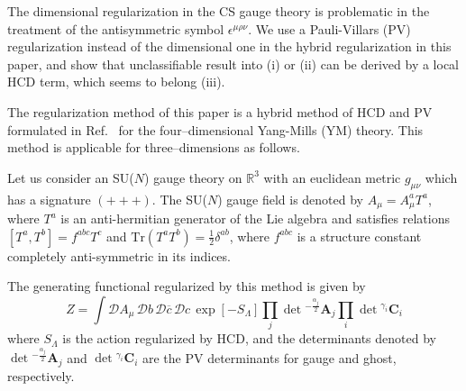 \documentclass[a4paper,12pt]{article}
\begin{document}
The dimensional regularization in the CS gauge theory is
problematic in the treatment of the antisymmetric symbol
$\epsilon^{\mu\rho\nu}$.
%
We use a Pauli-Villars (PV) regularization
instead of the dimensional one
in the hybrid regularization in this paper,
and show that unclassifiable result into (i) or (ii)
can be derived by a local HCD term,
which seems to belong (iii).





The regularization method of this paper is
a hybrid method of HCD and PV formulated in
Ref.~\cite{Nittoh:2000it} for the four--dimensional Yang-Mills (YM) theory.
%
This method is applicable for three--dimensions as follows.
%



Let us consider an SU($N$) gauge theory on $\mathbb{R}^3$
with an euclidean metric $g_{\mu\nu}$ which has a signature $(+++)$.
%
The SU($N$) gauge field is denoted by $A_\mu = A_\mu^a T^a$,
where $T^a$ is an anti-hermitian generator of
the Lie algebra and satisfies relations
$\left[T^a,T^b\right] = f^{abc}T^c$ and 
$\mathrm{Tr}\left(T^aT^b\right)=\frac{1}{2}\delta^{ab}$,
%
where $f^{abc}$ is a structure constant
completely anti-symmetric in its indices.

The generating functional regularized by this method is given by%
%
\begin{equation}
Z=
\int
\mathcal{D}A_\mu\,\mathcal{D}b\,
\mathcal{D}\overline c\,\mathcal{D}c\,
\exp \left[-S_\Lambda \right]
\prod_j \det{}^{-\frac{\alpha_j}{2}}\mathbf{A}_j
\prod_i \det{}^{\gamma_i}\mathbf{C}_i
\label{eq:generating functional}
\end{equation}
%
where $S_\Lambda$ is the action regularized by HCD,
and the determinants denoted by $\det{}^{-\frac{\alpha_j}{2}}\mathbf{A}_j$
and $\det{}^{\gamma_i}\mathbf{C}_i$ are
the PV determinants for gauge and ghost, respectively.
\end{document}
